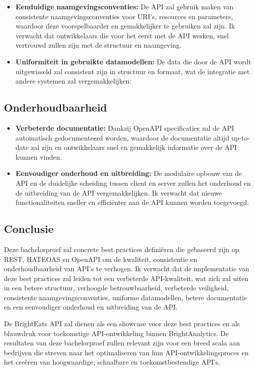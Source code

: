 \begin{itemize}
    \item \textbf{Eenduidige naamgevingsconventies:} De API zal gebruik maken van consistente naamgevingsconventies voor URI's, resources en parameters, waardoor deze voorspelbaarder en gemakkelijker te gebruiken zal zijn. Ik verwacht dat ontwikkelaars die voor het eerst met de API werken, snel vertrouwd zullen zijn met de structuur en naamgeving.
    \item \textbf{Uniformiteit in gebruikte datamodellen:} De data die door de API wordt uitgewisseld zal consistent zijn in structuur en formaat, wat de integratie met andere systemen zal vergemakkelijken.
\end{itemize}

\subsection{Onderhoudbaarheid}

\begin{itemize}
    \item \textbf{Verbeterde documentatie:} Dankzij OpenAPI specificaties zal de API automatisch gedocumenteerd worden, waardoor de documentatie altijd up-to-date zal zijn en ontwikkelaars snel en gemakkelijk informatie over de API kunnen vinden.
    \item \textbf{Eenvoudiger onderhoud en uitbreiding:} De modulaire opbouw van de API en de duidelijke scheiding tussen client en server zullen het onderhoud en de uitbreiding van de API vergemakkelijken. Ik verwacht dat nieuwe functionaliteiten sneller en efficiënter aan de API kunnen worden toegevoegd.
\end{itemize}

\subsection{Conclusie}

Deze bachelorproef zal concrete best practices definiëren die gebaseerd zijn op REST, HATEOAS en OpenAPI om de kwaliteit, consistentie en onderhoudbaarheid van API's te verhogen. Ik verwacht dat de implementatie van deze best practices zal leiden tot een verbeterde API-kwaliteit, wat zich zal uiten in een betere structuur, verhoogde betrouwbaarheid, verbeterde veiligheid, consistente naamgevingsconventies, uniforme datamodellen, betere documentatie en een eenvoudiger onderhoud en uitbreiding van de API.

De BrightEats API zal dienen als een showcase voor deze best practices en als blauwdruk voor toekomstige API-ontwikkeling binnen BrightAnalytics. De resultaten van deze bachelorproef zullen relevant zijn voor een breed scala aan bedrijven die streven naar het optimaliseren van hun API-ontwikkelingsproces en het creëren van hoogwaardige, schaalbare en toekomstbestendige API's.

